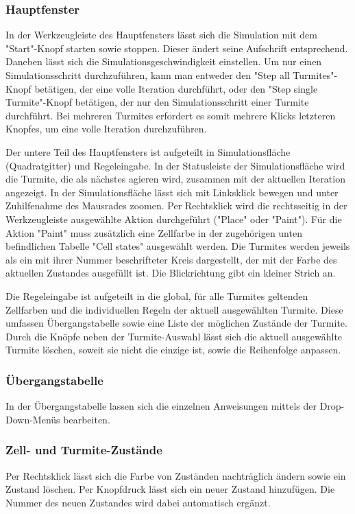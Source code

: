 \subsubsection{Hauptfenster}
In der Werkzeugleiste des Hauptfensters lässt sich die Simulation mit dem "Start"-Knopf starten sowie stoppen. Dieser ändert seine Aufschrift entsprechend. Daneben lässt sich die Simulationsgeschwindigkeit einstellen. Um nur einen Simulationsschritt durchzuführen, kann man entweder den "Step all Turmites"-Knopf betätigen, der eine volle Iteration durchführt, oder den "Step single Turmite"-Knopf betätigen, der nur den Simulationsschritt einer Turmite durchführt. Bei mehreren Turmites erfordert es somit mehrere Klicks letzteren Knopfes, um eine volle Iteration durchzuführen. 

Der untere Teil des Hauptfensters ist aufgeteilt in Simulationsfläche (Quadratgitter) und Regeleingabe. In der Statusleiste der Simulationsfläche wird die Turmite, die als nächstes agieren wird, zusammen mit der aktuellen Iteration angezeigt. In der Simulationsfläche lässt sich mit Linksklick bewegen und unter Zuhilfenahme des Mausrades zoomen. Per Rechtsklick wird die rechtsseitig in der Werkzeugleiste ausgewählte Aktion durchgeführt ("Place" oder "Paint"). Für die Aktion "Paint" muss zusätzlich eine Zellfarbe in der zugehörigen unten befindlichen Tabelle "Cell states" ausgewählt werden. Die Turmites werden jeweils als ein mit ihrer Nummer beschrifteter Kreis dargestellt, der mit der Farbe des aktuellen Zustandes ausgefüllt ist. Die Blickrichtung gibt ein kleiner Strich an.

Die Regeleingabe ist aufgeteilt in die global, für alle Turmites geltenden Zellfarben und die individuellen Regeln der aktuell ausgewählten Turmite. Diese umfassen Übergangstabelle sowie eine Liste der möglichen Zustände der Turmite. Durch die Knöpfe neben der Turmite-Auswahl lässt sich die aktuell ausgewählte Turmite löschen, soweit sie nicht die einzige ist, sowie die Reihenfolge anpassen. 

\subsubsection{Übergangstabelle}
In der Übergangstabelle lassen sich die einzelnen Anweisungen mittels der Drop-Down-Menüs bearbeiten.

\subsubsection{Zell- und Turmite-Zustände}
Per Rechtsklick lässt sich die Farbe von Zuständen nachträglich ändern sowie ein Zustand löschen. Per Knopfdruck lässt sich ein neuer Zustand hinzufügen. Die Nummer des neuen Zustandes wird dabei automatisch ergänzt.

